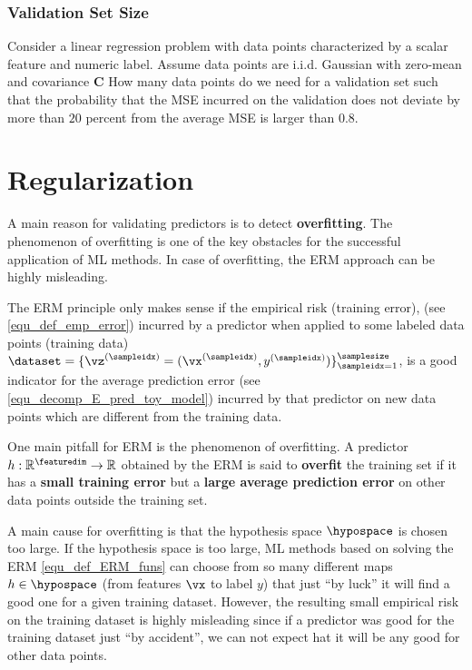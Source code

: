 \documentclass[12pt]{report}
\begin{document}
\subsection{Validation Set Size} 
Consider a linear regression problem with data points characterized 
by a scalar feature and numeric label. Assume data points are i.i.d. 
Gaussian with zero-mean and covariance $\mathbf{C}$ How many data points 
do we need for a validation set such that the probability that the MSE incurred on the validation 
does not deviate by more than $20$ percent from the average MSE is larger than $0.8$. 



\newpage 
\chapter{Regularization}
\label{ch_overfitting_regularization}


A main reason for validating predictors is to detect {\bf overfitting}. The 
phenomenon of overfitting is one of the key obstacles for the successful 
application of ML methods. In case of overfitting, the ERM approach can 
be highly misleading. 

The ERM principle only makes sense if the empirical risk (training error), 
(see \eqref{equ_def_emp_error}) incurred by a predictor when applied to 
some labeled data points (training data) $\dataset= \{ \vz^{(\sampleidx)} = (\vx^{(\sampleidx)},y^{(\sampleidx)}) \}_{\sampleidx=1}^{\samplesize}$, 
is a good indicator for the average prediction error (see \eqref{equ_decomp_E_pred_toy_model}) 
incurred by that predictor on new data points which are different 
from the training data. 

One main pitfall for ERM is the phenomenon of overfitting. 
A predictor $h: \mathbb{R}^{\featuredim} \rightarrow \mathbb{R}$ 
obtained by the ERM is said to {\bf overfit} the training set if it 
has a {\bf small training error} but a {\bf large average prediction error} 
on other data points outside the training set. 

A main cause for overfitting is that the hypothesis space 
$\hypospace$ is chosen too large. If the hypothesis space is 
too large, ML methods based on solving the ERM \eqref{equ_def_ERM_funs} 
can choose from so many different maps $h \in \hypospace$ 
(from features $\vx$ to label $y$) that just ``by luck'' it will find 
a good one for a given training dataset. However, the resulting 
small empirical risk on the training dataset is highly misleading 
since if a predictor was good for the training dataset just 
``by accident'', we can not expect hat it will be any good for 
other data points.
\end{document}
